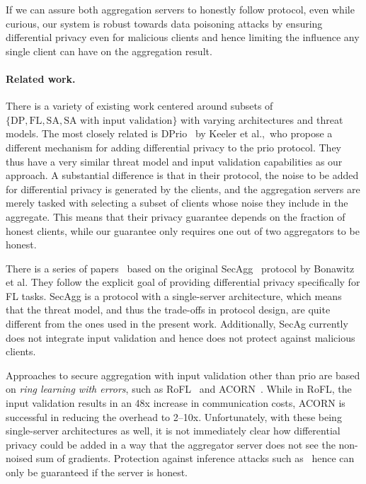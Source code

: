 \documentclass{article}
\begin{document}
If we can assure both aggregation servers to honestly follow protocol, even while curious, our system is robust towards data poisoning attacks by ensuring differential privacy even for malicious clients and hence limiting the influence any single client can have on the aggregation result.

\paragraph{Related work.}
There is a variety of existing work centered around subsets of
$\{\textrm{DP}, \textrm{FL}, \textrm{SA}, \textrm{SA with input validation}\}$ with varying
architectures and threat models. The most closely related is
DPrio~\cite{dprio} by Keeler et al.,\ who propose a different mechanism for
adding differential privacy to the prio protocol. They thus have a very similar
threat model and input validation capabilities as our approach. A substantial
difference is that in their protocol, the noise to be added for differential
privacy is generated by the clients, and the aggregation servers are merely
tasked with selecting a subset of clients whose noise they include in the
aggregate. This means that their privacy guarantee depends on the fraction of
honest clients, while our guarantee only requires one out of two aggregators to
be honest.

There is a series of
papers~\cite{SecAggImprovement,Kairouz2021TheDD,SecAggSkellam,SecAggFundamental}
based on the original SecAgg~\cite{secagg} protocol by Bonawitz et al. They
follow the explicit goal of providing differential privacy specifically for FL
tasks. SecAgg is a protocol with a single-server architecture, which means that
the threat model, and thus the trade-offs in protocol design, are quite
different from the ones used in the present work. Additionally, SecAg currently
does not integrate input validation and hence does not protect against malicious
clients.

Approaches to secure aggregation with input validation other than prio are based on
\textit{ring learning with errors}, such as RoFL~\cite{rofl} and ACORN~\cite{acorn}.
While in RoFL, the input validation results in an 48x increase in communication
costs, ACORN is successful in reducing the overhead to 2--10x. Unfortunately,
with these being single-server architectures as well, it is not immediately
clear how differential privacy could be added in a way that the aggregator
server does not see the non-noised sum of gradients. Protection against inference
attacks such as~\cite{7958568} hence can only be guaranteed if the server is honest.
\end{document}
